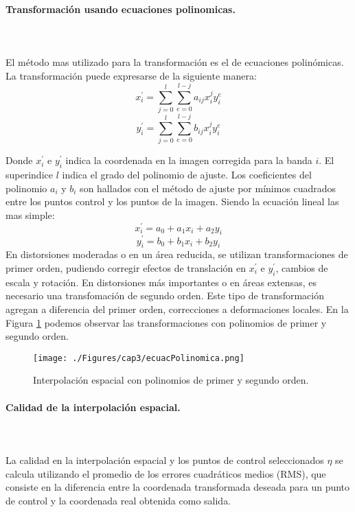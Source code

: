 \paragraph{Transformación usando ecuaciones polinomicas. }\mbox{}\\\mbox{}\\
El m\'etodo mas utilizado para la transformaci\'on es el de ecuaciones polin\'omicas. La transformaci\'on puede expresarse de la siguiente manera:
	\begin{equation}
	x^{'}_{i} = \sum_{j=0}^{l} \sum_{e=0}^{l-j} a_{ij}x^{j}_{i}y^{e}_{i}
	\end{equation} 
		\begin{equation}
		y^{'}_{i} = \sum_{j=0}^{l} \sum_{e=0}^{l-j} b_{ij}x^{j}_{i}y^{e}_{i}
		\end{equation} 


Donde $ x^{'}_{i} $ e $ y^{'}_{i} $ indica la coordenada en la imagen corregida para la banda $ i $. El superindice $ l $ indica el grado del polinomio de ajuste. Los coeficientes del polinomio $ a_{i} $ y $ b_{i} $ son hallados con el m\'etodo de ajuste por m\'inimos cuadrados entre los puntos control y los puntos de la imagen. Siendo la ecuaci\'on lineal las mas simple:
	\begin{equation}
	x^{'}_{i} = a_{0}+a_{1}x_{i}+a_{2}y_{i}
	\end{equation} 
		\begin{equation}
		y^{'}_{i} = b_{0}+b_{1}x_{i}+b_{2}y_{i}
		\end{equation} 
En distorsiones moderadas o en un \'area reducida, se utilizan transformaciones de primer orden, pudiendo corregir efectos de translaci\'on en $ x^{'}_{i} $ e $ y^{'}_{i} $, cambios de escala y rotaci\'on.
En distorsiones m\'as importantes o en \'areas extensas, es necesario una transfomaci\'on de segundo orden. Este tipo de transformaci\'on agregan a diferencia del primer orden, correcciones a deformaciones locales.
En la Figura \ref{fig:intPolEcua} podemos observar las transformaciones con polinomios de primer y segundo orden.
    \begin{figure}[H]
    	\centering
    	\texttt{[image: ./Figures/cap3/ecuacPolinomica.png]}
    	\caption{Interpolaci\'on espacial con polinomios de primer y segundo orden.}
    	\label{fig:intPolEcua}
    \end{figure}
  \paragraph{Calidad de la interpolaci\'on espacial. }\mbox{}\\\mbox{}\\
 La calidad en la interpolaci\'on espacial y los puntos de control seleccionados $ \eta $ se calcula utilizando el promedio de los errores cuadráticos medios (RMS), que consiste en la diferencia entre la coordenada transformada deseada para un punto de control y la coordenada real obtenida como salida.

